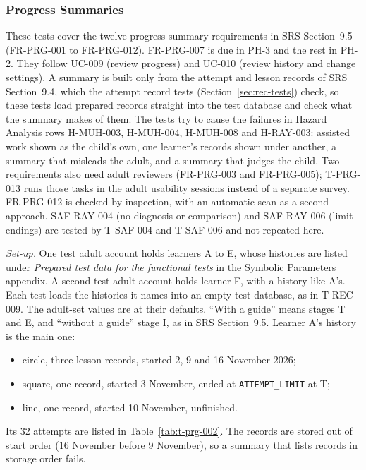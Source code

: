 \documentclass[12pt, titlepage]{article}
\begin{document}
\subsubsection{Progress Summaries}
\label{sec:prg-tests}

These tests cover the twelve progress summary requirements in SRS
Section~9.5 (FR-PRG-001 to FR-PRG-012). FR-PRG-007 is due in PH-3 and the
rest in PH-2. They follow UC-009 (review progress) and UC-010 (review
history and change settings). A summary is built only from the attempt and
lesson records of SRS Section~9.4, which the attempt record tests
(Section~\ref{sec:rec-tests}) check, so these tests load prepared records
straight into the test database and check what the summary makes of them.
The tests try to cause the failures in Hazard Analysis rows H-MUH-003,
H-MUH-004, H-MUH-008 and H-RAY-003: assisted work shown as the child's own,
one learner's records shown under another, a summary that misleads the
adult, and a summary that judges the child. Two requirements also need adult
reviewers (FR-PRG-003 and FR-PRG-005); T-PRG-013 runs those tasks in the
adult usability sessions instead of a separate survey. FR-PRG-012 is checked
by inspection, with an automatic scan as a second approach. SAF-RAY-004 (no
diagnosis or comparison) and SAF-RAY-006 (limit endings) are tested by
T-SAF-004 and T-SAF-006 and not repeated here.

\emph{Set-up.} One test adult account holds learners A to E, whose
histories are listed under \emph{Prepared test data for the functional
tests} in the Symbolic Parameters appendix. A second test adult account
holds learner F, with a history like A's. Each test loads the histories it
names into an empty test database, as in T-REC-009. The adult-set values are
at their defaults. ``With a guide'' means stages T and E, and ``without a
guide'' stage I, as in SRS Section~9.5. Learner A's history is the main one:
\begin{itemize}
\item circle, three lesson records, started 2, 9 and 16 November 2026;
\item square, one record, started 3 November, ended at
\texttt{ATTEMPT\_LIMIT} at T;
\item line, one record, started 10 November, unfinished.
\end{itemize}
Its 32 attempts are listed in Table~\ref{tab:t-prg-002}. The records are
stored out of start order (16 November before 9 November), so a summary that
lists records in storage order fails.
\end{document}
